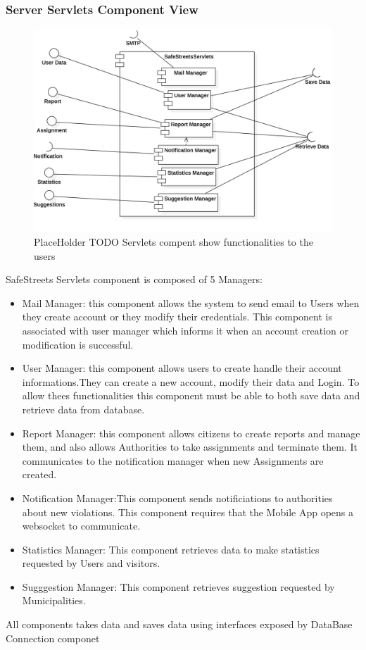 \subsubsection{Server Servlets Component View}
\begin{figure}[H]
\centering
\includegraphics[width=\textwidth]{Images/ServletsComponent.png}
\caption{\label{fig:ComWI}PlaceHolder TODO Servlets compent show functionalities to the users}
\end{figure}
 SafeStreets Servlets component is composed of 5 Managers:
\begin{itemize}
\item Mail Manager: this component allows the system to send email to Users when they create account or they modify their credentials. This component is associated with user manager which informs it when an account creation or modification is successful.
\item User Manager: this component allows users to create handle their account informations.They can create a new account, modify their data and Login. To allow thees functionalities this component must be able to both save data and retrieve data from database.
\item Report Manager: this component allows citizens to create reports and manage them, and also allows Authorities to take assignments and terminate them. It communicates to the notification manager when new Assignments are created.
\item Notification Manager:This component sends notificiations to authorities about new violations. This component requires that the Mobile App opens a websocket to communicate. 
\item Statistics Manager: This component retrieves data to make  statistics requested by Users and visitors.
\item Sugggestion Manager: This component retrieves suggestion requested by Municipalities.
\end{itemize}
All components takes data and saves data using interfaces exposed by DataBase Connection componet
